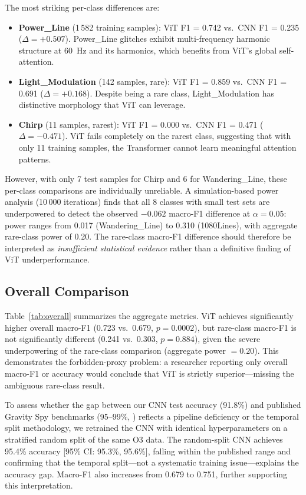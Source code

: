 \documentclass[12pt]{article}
\newcommand{\vitMacroF}{0.723}
\newcommand{\vitRareF}{0.241}
\newcommand{\cnnMacroF}{0.679}
\newcommand{\cnnRareF}{0.303}
\newcommand{\pvalueOverall}{0.0002}
\newcommand{\pvalueRare}{0.884}
\newcommand{\powerLineDiffOthree}{+0.507}
\newcommand{\lightModDiff}{+0.168}
\newcommand{\chirpDiff}{-0.471}
\newcommand{\powerLineVitF}{0.742}
\newcommand{\powerLineCnnF}{0.235}
\begin{document}
The most striking per-class differences are:
\begin{itemize}
  \item \textbf{Power\_Line} (1\,582 training samples): ViT F1 = \powerLineVitF{}
    vs.\ CNN F1 = \powerLineCnnF{} ($\Delta = \powerLineDiffOthree$).
    Power\_Line glitches exhibit multi-frequency harmonic structure at 60~Hz
    and its harmonics, which benefits from ViT's global self-attention.
  \item \textbf{Light\_Modulation} (142 samples, rare): ViT F1 = 0.859
    vs.\ CNN F1 = 0.691 ($\Delta = \lightModDiff$).
    Despite being a rare class, Light\_Modulation has distinctive morphology
    that ViT can leverage.
  \item \textbf{Chirp} (11 samples, rarest): ViT F1 = 0.000
    vs.\ CNN F1 = 0.471 ($\Delta = \chirpDiff$).
    ViT fails completely on the rarest class, suggesting that with only 11
    training samples, the Transformer cannot learn meaningful attention
    patterns.
\end{itemize}

However, with only 7 test samples for Chirp and 6 for Wandering\_Line,
these per-class comparisons are individually unreliable.
A simulation-based power analysis (10\,000 iterations) finds that all 8 classes
with small test sets are underpowered to detect the observed $-0.062$ macro-F1 difference
at $\alpha = 0.05$: power ranges from 0.017 (Wandering\_Line) to 0.310
(1080Lines), with aggregate rare-class power of 0.20.
The rare-class macro-F1 difference should therefore be interpreted as
\emph{insufficient statistical evidence} rather than a definitive finding of
ViT underperformance.

\subsection{Overall Comparison}
\label{sec:overall}

Table~\ref{tab:overall} summarizes the aggregate metrics.
ViT achieves significantly higher overall macro-F1 (\vitMacroF{} vs.\
\cnnMacroF{}, $p = \pvalueOverall$), but rare-class macro-F1 is not
significantly different
(\vitRareF{} vs.\ \cnnRareF{}, $p = \pvalueRare$), given the severe
underpowering of the rare-class comparison (aggregate power $= 0.20$).
This demonstrates the forbidden-proxy problem: a researcher reporting only
overall macro-F1 or accuracy would conclude that ViT is strictly
superior---missing the ambiguous rare-class result.

To assess whether the gap between our CNN test accuracy (91.8\%) and
published Gravity Spy benchmarks (95--99\%,
\citealt{Zevin2017}) reflects a pipeline deficiency or the temporal split
methodology, we retrained the CNN with identical hyperparameters on a
stratified random split of the same O3 data.
The random-split CNN achieves 95.4\% accuracy
[95\% CI: 95.3\%, 95.6\%], falling within the published range and confirming
that the temporal split---not a systematic training issue---explains the
accuracy gap.
Macro-F1 also increases from 0.679 to 0.751, further supporting this
interpretation.
\end{document}
